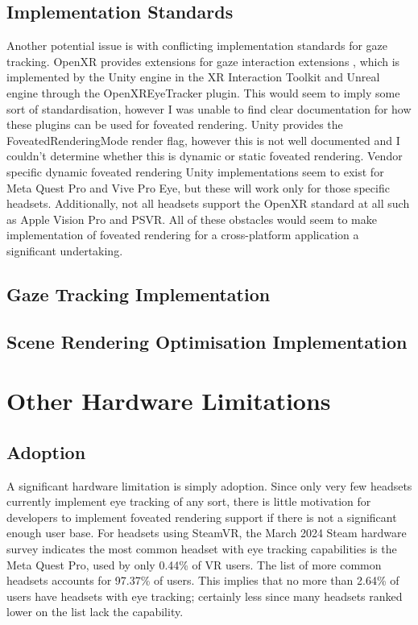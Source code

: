 \documentclass[a4paper,11pt]{article}
\begin{document}
\subsection{Implementation Standards}
Another potential issue is with conflicting implementation standards for gaze tracking. OpenXR provides extensions for gaze interaction extensions \cite{xr_gaze}, which is implemented by the Unity engine in the XR Interaction Toolkit \cite{xr_gaze_unity} and Unreal engine through the OpenXREyeTracker plugin\cite{xr_gaze_unreal}. This would seem to imply some sort of standardisation, however I was unable to find clear documentation for how these plugins can be used for foveated rendering. Unity provides the FoveatedRenderingMode render flag\cite{unity_fove}, however this is not well documented and I couldn't determine whether this is dynamic or static foveated rendering. Vendor specific dynamic foveated rendering Unity implementations seem to exist for Meta Quest Pro\cite{meta_unity} and Vive Pro Eye\cite{vive_unity}, but these will work only for those specific headsets. Additionally, not all headsets support the OpenXR standard at all such as Apple Vision Pro and PSVR\cite{openxr_conform}. All of these obstacles would seem to make implementation of foveated rendering for a cross-platform application a significant undertaking.

\subsection{Gaze Tracking Implementation}

\subsection{Scene Rendering Optimisation Implementation}

\section{Other Hardware Limitations}
\subsection{Adoption}
A significant hardware limitation is simply adoption. Since only very few headsets currently implement eye tracking of any sort, there is little motivation for developers to implement foveated rendering support if there is not a significant enough user base. For headsets using SteamVR, the March 2024 Steam hardware survey indicates the most common headset with eye tracking capabilities is the Meta Quest Pro, used by only 0.44\% of VR users. The list of more common headsets accounts for 97.37\% of users. This implies that no more than 2.64\% of users have headsets with eye tracking; certainly less since many headsets ranked lower on the list lack the capability.
\end{document}
